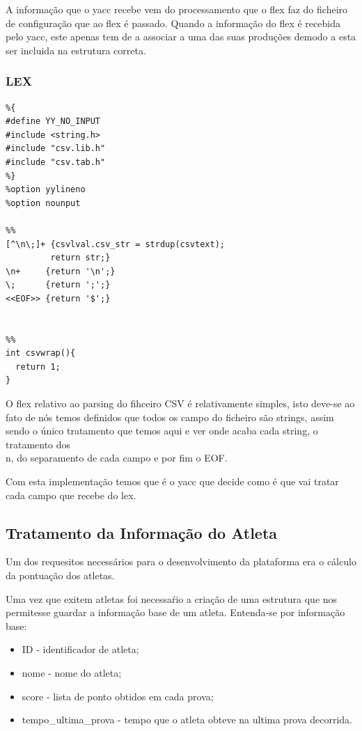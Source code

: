 \documentclass[11pt, a4paper, oneside]{article}
\begin{document}
A informação que o yacc recebe vem do processamento que o flex faz do ficheiro de configuração que ao flex é passado.
Quando a informação do flex é recebida pelo yacc, este apenas tem de a associar a uma das suas produções demodo a esta ser incluida na estrutura correta.


\subsubsection{LEX}

\begin{lstlisting}
%{
#define YY_NO_INPUT
#include <string.h>
#include "csv.lib.h"
#include "csv.tab.h"
%}
%option yylineno
%option nounput

%%
[^\n\;]+ {csvlval.csv_str = strdup(csvtext);
         return str;}
\n+     {return '\n';}
\;      {return ';';}
<<EOF>> {return '$';}


%%
int csvwrap(){
  return 1;
}
\end{lstlisting}

O flex relativo ao parsing do fihceiro CSV é relativamente simples, isto deve-se ao fato de nós temos definidos que todos os campo do ficheiro são strings, assim sendo o único tratamento que temos aqui e ver onde acaba cada string, o tratamento dos \\n, do separamento de cada campo e por fim o EOF.

Com esta implementação temos que é o yacc que decide como é que vai tratar cada campo que recebe do lex.
 
\newpage
\subsection{Tratamento da Informação do Atleta}

Um dos requesitos necessários para o desenvolvimento da plataforma era o cálculo da pontuação dos atletas. 

Uma vez que exitem atletas foi necessaŕio a criação de uma estrutura que nos permitesse guardar a informação base de um atleta.
Entenda-se por informação base:
\begin{itemize}
\item ID - identificador de atleta;
\item nome - nome do atleta;
\item score - lista de ponto obtidos em cada prova;
\item tempo\_ultima\_prova - tempo que o atleta obteve na ultima prova decorrida.
\end{itemize}
\end{document}
